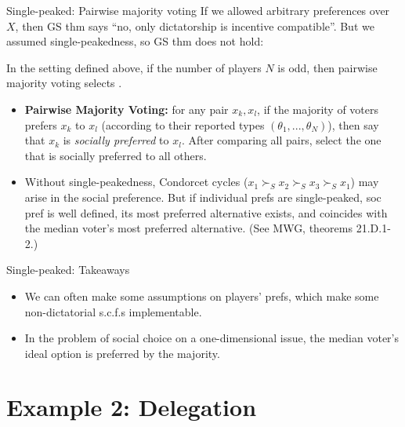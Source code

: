 \documentclass[english,10pt
,aspectratio=169
]{beamer}
\begin{document}
\begin{frame}{Single-peaked: Pairwise majority voting}
	If we allowed arbitrary preferences over $X$, then GS thm says ``no, only dictatorship is incentive compatible''. But we assumed single-peakedness, so GS thm does not hold:
	\begin{theorem}
		In the setting defined above, if the number of players $N$ is odd, then \alert{pairwise majority voting} selects .
	\end{theorem}
	\begin{itemize}
		\item \textbf{Pairwise Majority Voting:} for any pair $x_k, x_l$, if the majority of voters prefers $x_k$ to $x_l$ (according to their reported types $(\theta_1,...,\theta_N)$), then say that $x_k$ is \emph{socially preferred} to $x_l$. After comparing all pairs, select the one that is socially preferred to all others.
		\item Without single-peakedness, Condorcet cycles ($x_1 \succ_S x_2 \succ_S x_3 \succ_S x_1$) may arise in the social preference. But if individual prefs are single-peaked, soc pref is well defined, its most preferred alternative exists, and coincides with the median voter's most preferred alternative. (See MWG, theorems 21.D.1-2.)
	\end{itemize}
\end{frame}


\begin{frame}{Single-peaked: Takeaways}
	\begin{itemize}
		\item We can often make some assumptions on players' prefs, which make some non-dictatorial s.c.f.s implementable.
		\item In the problem of social choice on a one-dimensional issue, the median voter's ideal option is preferred by the majority.
	\end{itemize}
\end{frame}



\section{Example 2: Delegation}
\end{document}
